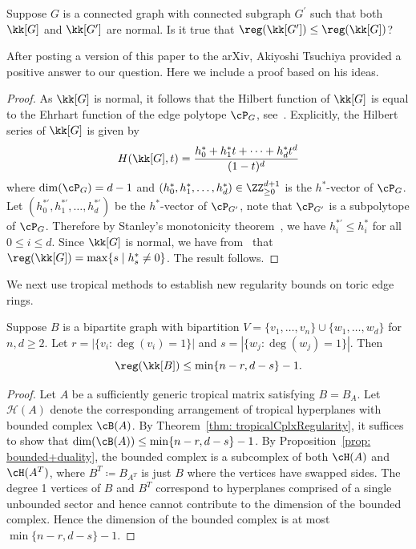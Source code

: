 \begin{question}\label{question: regularity-subgraphs}
Suppose $G$ is a connected graph with connected subgraph $G^\prime$ such that both $\kk[G]$ and $\kk[G^\prime]$ are normal.  Is it true that $\reg(\kk[G^\prime]) \leq \reg(\kk[G])$?
\end{question}

After posting a version of this paper to the arXiv, Akiyoshi Tsuchiya provided a positive answer to our question.  Here we include a proof based on his ideas. 

\begin{proof}
    As $\kk[G]$ is normal, it follows that the Hilbert function of $\kk[G]$ is equal to the Ehrhart function of the edge polytope $\cP_G$, see~\cite[Lemma 4.22(b)]{HHOBinomial}.
    Explicitly, the Hilbert series of $\kk[G]$ is given by
    \[
    H(\kk[G], t) = \frac{h_0^* + h_1^*t + \dots + h_d^*t^d}{(1-t)^d}
    \]
    where $\dim(\cP_G) = d-1$ and $(h_0^*, h_1^*, \dots, h_d^*) \in \ZZ_{\geq 0}^{d+1}$ is the $h^*$-vector of $\cP_G$.
    Let $(h_0^{*'}, h_1^{*'}, \dots, h_d^{*'})$ be the $h^{*}$-vector of $\cP_{G'}$, note that $\cP_{G'}$ is a subpolytope of $\cP_{G}$.
    Therefore by Stanley's monotonicity theorem~\cite{stanley1993}, we have $h_i^{*'} \leq h_i^*$ for all $0\leq i \leq d$.
    Since $\kk[G]$ is normal, we have from~\cite[Lemma 2.5]{BenVar} that $\reg(\kk[G]) = \max\{s \mid h_s^* \neq 0\}$. The result follows.
\end{proof}

We next use tropical methods to establish new regularity bounds on toric edge rings.

\begin{theorem}\label{thm: regbound}
Suppose $B$ is a bipartite graph with bipartition $V=\{v_1, \dots, v_n\} \cup \{w_1, \dots, w_d\}$ for $n, d \geq 2$. Let $r= |\{v_i:\deg(v_i) = 1\}|$ and $s = |\{w_j: \deg(w_j) = 1\}|$.  Then
\[ \reg(\kk[B]) \leq \min\{n-r, d-s\}-1.\]
\end{theorem}

\begin{proof}
Let $A$ be a sufficiently generic tropical matrix satisfying $B = B_A$.  Let ${\mathcal H}(A)$ denote the corresponding arrangement of tropical hyperplanes with bounded complex $\cB(A)$. By Theorem~\ref{thm: tropicalCplxRegularity}, it suffices to show that $\dim(\cB(A)) \leq \min\{n-r,d-s\} -1$.
By Proposition~\ref{prop: bounded+duality}, the bounded complex is a subcomplex of both $\cH(A)$ and $\cH(A^T)$, where $B^T \coloneqq  B_{A^T}$ is just $B$ where the vertices have swapped sides.  
The degree 1 vertices of $B$ and $B^T$ correspond to hyperplanes comprised of a single unbounded sector and hence cannot contribute to the dimension of the bounded complex.
Hence the dimension of the bounded complex is at most $\min\{n-r, d-s\} -1$.
\end{proof}

